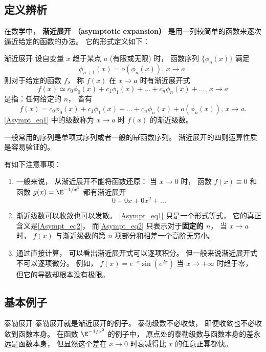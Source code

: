 

\subsection{定义辨析}\label{Asympt_sub1}
在数学中， \textbf{渐近展开 （asymptotic expansion）} 是用一列较简单的函数来逐次逼近给定的函数的办法。 它的形式定义如下：

\begin{definition}{渐近展开}
设自变量 $x$ 趋于某点 $a$ (有限或无限) 时， 函数序列 $\{\phi_{n}(x)\}$ 满足
$$
\phi_{n+1}(x)=o(\phi_n(x)),\,x\to a.
$$
则对于给定的函数 $f$， 称 $f(x)$ 在 $x\to a$ 时有渐近展开式
\begin{equation}\label{Asympt_eq1}
f(x)\simeq c_0\phi_0(x)+c_1\phi_1(x)+...+c_n\phi_n(x)+...,\,x\to a
\end{equation}
是指：任何给定的 $n$， 皆有
\begin{equation}\label{Asympt_eq2}
f(x)=c_0\phi_0(x)+c_1\phi_1(x)+...+c_n\phi_n(x)+o(\phi_n(x)),\,x\to a.
\end{equation}
\autoref{Asympt_eq1} 中的级数称为 $x\to a$ 时 $f(x)$ 的渐近级数。
\end{definition}

一般常用的序列是单项式序列或者一般的幂函数序列。 渐近展开的四则运算性质是容易验证的。

有如下注意事项：
\begin{enumerate}
\item 一般来说， 从渐近展开不能将函数还原： 当 $x\to0$ 时， 函数 $f(x)\equiv 0$ 和函数 $g(x)=\E^{-1/x^2}$ 都有渐近展开
$$
0+0x+0x^2+...
$$

\item 渐近级数可以收敛也可以发散。 \autoref{Asympt_eq1} 只是一个形式等式， 它的真正含义是\autoref{Asympt_eq2}，  而\autoref{Asympt_eq2} 只表示对于\textbf{固定的 $n$}， 当 $x\to a$ 时， $f(x)$ 与渐近级数的第 $n$ 项部分和相差一个高阶无穷小。 

\item 通过直接计算， 可以看出渐近展开式可以逐项积分。 但一般来说渐近展开式不可以逐项微分。 例如， $f(x)=e^{-x}\sin(e^{2x})$ 当 $x\to+\infty$ 时趋于零， 但它的导数却根本没有极限。
\end{enumerate}

\subsection{基本例子}
\begin{example}{泰勒展开}
泰勒展开就是渐近展开的例子。 泰勒级数不必收敛， 即便收敛也不必收敛到函数本身。 在函数 $\E^{-1/x^2}$ 的例子中， 原点处的泰勒级数与函数本身的差永远是函数本身， 但显然这个差在 $x\to0$ 时衰减得比 $x$ 的任意正幂都快。
\end{example}


